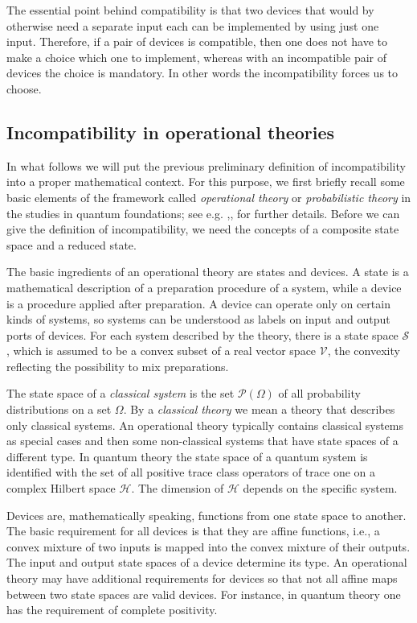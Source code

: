 \documentclass[12pt]{article}
\theoremstyle{definition}
\newcommand{\hi}{\mathcal{H}} %
\begin{document}
The essential point behind compatibility is that two devices that would by otherwise need a separate input each can be implemented by using just one input.  
Therefore, if a pair of devices is compatible, then one does not have to make a choice which one to implement, whereas with an incompatible pair of devices the choice is mandatory. In other words the incompatibility forces us to choose. 


\subsection{Incompatibility in operational theories}\label{sec:definition}

In what follows we will put the previous preliminary definition of incompatibility into a proper mathematical context. For this purpose, we first briefly recall some basic elements of the framework called \emph{operational theory} or \emph{probabilistic theory} in the studies in quantum foundations; see e.g. \cite{BaBaLeWi07},\cite{ChDaPe10},\cite{StBu14} for further details.
Before we can give the definition of incompatibility, we need the concepts of a composite state space and a reduced state.

The basic ingredients of an operational theory are states and devices.
A state is a mathematical description of a preparation procedure of a system, while a device is a procedure applied after preparation. 
A device can operate only on certain kinds of systems, so systems can be understood as labels on input and output ports of devices. 
For each system described by the theory, there is a state space $\mathcal{S}$, which is assumed to be a convex subset of a real vector space $\mathcal{V}$, the convexity reflecting the possibility to mix preparations.

The state space of a \emph{classical system} is the set $\mathcal{P}(\Omega)$ of all probability distributions on a set $\Omega$. 
By a \emph{classical theory} we mean a theory that describes only classical systems.
An operational theory typically contains classical systems as special cases and then some non-classical systems that have state spaces of a different type.
In quantum theory the state space of a quantum system is identified with the set of all positive trace class operators of trace one on a complex Hilbert space $\hi$. 
The dimension of $\hi$ depends on the specific system.

Devices are, mathematically speaking, functions from one state space to another.
The basic requirement for all devices is that they are affine functions, i.e., a convex mixture of two inputs is mapped into the convex mixture of their outputs. 
The input and output state spaces of a device determine its type. 
An operational theory may have additional requirements for devices so that not all affine maps between two state spaces are valid devices. 
For instance, in quantum theory one has the requirement of complete positivity.
\end{document}
